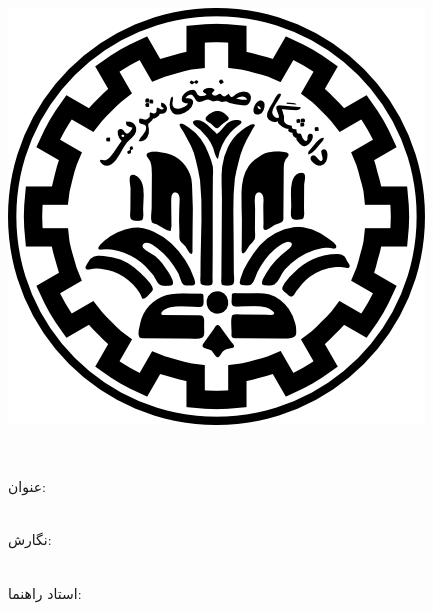 
\pagestyle{empty}

\begin{center}

\includegraphics[scale=0.2]{front/template/images/logo.png}

\begin{Large}

\vspace{-0.2cm}
\ThesisUniversity \\[-0.3em]
\ThesisDepartment

\vspace{0.5cm}

\ThesisType 
\ThesisMajor

\end{Large}

\vspace{1cm}

\large{عنوان:}\\[-.5em]
\huge{\textbf{\ThesisTitle}}\\

\vspace{1cm}

\large{نگارش:}\\
\Large{\textbf{\ThesisAuthor}}\\

\vspace{0.7cm}

\large{استاد راهنما:}\\ 
\Large{\textbf{\ThesisSupervisor}}\\

\vspace{0.8cm}

\large{\ThesisDate}

\end{center}

\newpage
